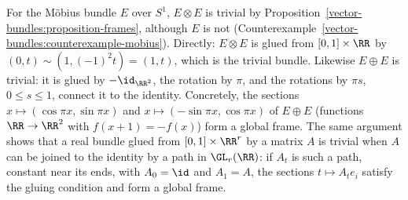 \begin{example}\label{vector-bundles:example-mobius-square}
For the M\"obius bundle $E$ over $S^1$, $E \otimes E$ is trivial by Proposition~\ref{vector-bundles:proposition-frames}, although $E$ is not (Counterexample~\ref{vector-bundles:counterexample-mobius}). Directly: $E \otimes E$ is glued from
$[0, 1] \times \RR$ by $(0, t) \sim (1, (-1)^2t) = (1, t)$, which is the trivial bundle. Likewise $E \oplus E$ is trivial: it is glued by $-\id_{\RR^2}$, the rotation by $\pi$, and the rotations by $\pi s$, $0 \leq s \leq 1$,
connect it to the identity. Concretely, the sections $x \mapsto (\cos\pi x, \sin\pi x)$ and $x \mapsto (-\sin\pi x, \cos\pi x)$ of $E \oplus E$ (functions $\RR \to \RR^2$ with
$f(x + 1) = -f(x)$) form a global frame. The same argument shows that a real bundle glued from $[0, 1] \times \RR^r$ by a matrix $A$ is trivial when $A$ can be joined to the identity by a path in $\GL_r(\RR)$: if $A_t$ is such a path, constant near its ends, with $A_0 = \id$ and $A_1 = A$,
the sections $t \mapsto A_te_i$ satisfy the gluing condition and form a global frame.
\end{example}

